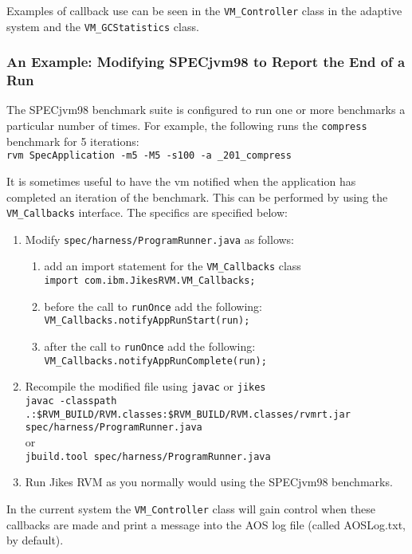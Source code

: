 Examples of callback use can be seen in the {\tt VM\_Controller} class in the
adaptive system and the {\tt VM\_GCStatistics} class.

\subsubsection{An Example: Modifying SPECjvm98 to Report the End of a
Run}\label{sssec:callback-example}
The SPECjvm\Rboth{}98 benchmark suite is configured to run one or more benchmarks
a particular number of times.  For example, the following runs the
{\tt compress} benchmark for 5 iterations:\\
{\tt rvm SpecApplication -m5 -M5 -s100 -a \_201\_compress}

It is sometimes useful to have the vm notified when the application
has completed an iteration of the benchmark.   This can be performed
by using the {\tt VM\_Callbacks} interface.  The specifics are
specified below:
\begin{enumerate}
\item Modify {\tt spec/harness/ProgramRunner.java} as follows:
	\begin{enumerate}
	\item add an import statement for the {\tt VM\_Callbacks} class \\
    {\tt import com.ibm.JikesRVM.VM\_Callbacks;}
	\item before the call to {\tt runOnce} add the following: \\
    {\tt VM\_Callbacks.notifyAppRunStart(run);}
	\item after the call to {\tt runOnce} add the following: \\	
    {\tt VM\_Callbacks.notifyAppRunComplete(run);}
	\end{enumerate}

\item Recompile the modified file using {\tt javac} or {\tt jikes} \\
   {\tt javac -classpath 
   .:\$RVM\_BUILD/RVM.classes:\$RVM\_BUILD/RVM.classes/rvmrt.jar
   spec/harness/ProgramRunner.java} \\
or \\
   {\tt jbuild.tool spec/harness/ProgramRunner.java} \\

\item Run Jikes RVM as you normally would using the SPECjvm98 benchmarks.
\end{enumerate}

In the current system the {\tt VM\_Controller} class will gain control
when these callbacks are made and print a message into the AOS log
file (called AOSLog.txt, by default).

